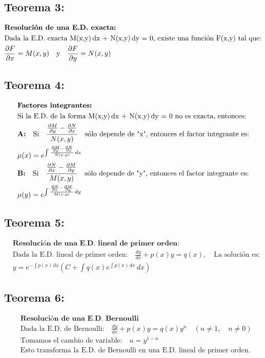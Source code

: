\documentclass[a4paper,12pt,numbers=noenddot]{scrreprt}
\begin{document}
\subsection*{Teorema 3:}
\begin{align*}
    &\textbf{Resolución de una E.D. exacta:}\\
    &\text{Dada la E.D. exacta M(x,y)\,dx + N(x,y)\,dy = 0, existe una función F(x,y) tal que:}\\
    &\frac{\partial F}{\partial x} = M(x,y) \quad \text{y} \quad \frac{\partial F}{\partial y} = N(x,y)
\end{align*}

\subsection*{Teorema 4:}
\begin{align*}
    &\textbf{Factores integrantes:}\\
    &\text{Si la E.D. de la forma M(x,y)\,dx + N(x,y)\,dy = 0 no es exacta, entonces:}\\
    &\textbf{A:} \quad \text{Si} \quad \frac{\frac{\partial M}{\partial y} - \frac{\partial N}{\partial x}}{N(x,y)} \quad \text{sólo depende de "x", entonces el factor integrante es:}\\
    &\mu(x) = e^{\int \frac{\frac{\partial M}{\partial y} - \frac{\partial N}{\partial x}}{N(x,y)} \,dx}\\
    &\textbf{B:} \quad \text{Si} \quad \frac{\frac{\partial N}{\partial x} - \frac{\partial M}{\partial y}}{M(x,y)} \quad \text{sólo depende de "y", entonces el factor integrante es:}\\
    &\mu(y) = e^{\int \frac{\frac{\partial N}{\partial x} - \frac{\partial M}{\partial y}}{M(x,y)} \,dy}
\end{align*}
\subsection*{Teorema 5:}
\begin{align*}
    &\textbf{Resolución de una E.D. lineal de primer orden:}\\
    &\text{Dada la E.D. lineal de primer orden:} \quad \frac{dy}{dx} + p(x)y = q(x), \quad \text{La solución es:}\\
    &y = e^{-\int p(x)\,dx} \left( C + \int q(x) e^{\int p(x)\,dx} \,dx \right)
\end{align*}
\subsection*{Teorema 6:}
\begin{align*}
    &\textbf{Resolución de una E.D. Bernoulli}\\
    &\text{Dada la E.D. de Bernoulli:} \quad \frac{dy}{dx} + p(x)y = q(x)y^n \quad (n \neq 1, \quad n\neq 0)\\
    &\text{Tomamos el cambio de variable:} \quad u = y^{1-n}\\
    &\text{Esto transforma la E.D. de Bernoulli en una E.D. lineal de primer orden.}
\end{align*}
\end{document}

